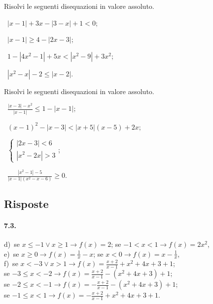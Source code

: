 \begin{esercizio}[\Ast]
 \label{ese:7.36}
Risolvi le seguenti disequazioni in valore assoluto.
\begin{multicols}{2}
 \begin{enumeratea}
 \item~$\left|x-1\right|+3x-\left|3-x\right|+1<0$;
 \item~$\left|x-1\right|\ge 4-\left|2x-3\right|$;
 \item~$1-\left|4x^2-1\right|+5x<\left|x^2-9\right|+3x^2$;
 \item~$\left|x^2-x\right|-2\le \left|x-2\right|$.
 \end{enumeratea}
 \end{multicols}
\end{esercizio}

\begin{esercizio}[\Ast]
 \label{ese:7.37}
Risolvi le seguenti disequazioni in valore assoluto.
\begin{multicols}{2}
 \begin{enumeratea}
 \item~$\frac{\left|x-3\right|-x^2}{\left|x-1\right|}\le 1-\left|x-1\right|$;
 \item~$(x-1)^2-\left|x-3\right|<\left|x+5\right|(x-5)+2x$;
 \item~$\left\{\begin{array}{l}{\left|2x-3\right|<6}\\{\left|x^2-2x\right|>3}\end{array}\right.$;
 \item~$\frac{\left|x^2-1\right|-5}{\left|x-1\right|(x^2-x-6)}\ge 0$.
 \end{enumeratea}
 \end{multicols}
\end{esercizio}

\subsection{Risposte}
\paragraph{7.3.} d)~se $x\le -1\vee x\ge 1\to f(x)=2 $; se $-1<x<1 \to f(x)=2x^2$,\protect\\
\quad e)~se $x\ge 0 \to f(x)=\frac 1 x-x$; se $x<0 \to f(x)=x-\frac 1 x$,\protect\\
\quad f)~se $x<-3\vee x>1 \to f(x)=\frac{x+2}{x-1}+x^2+4x+3+1$;\protect\\ se $-3\le x<-2 \to f(x)=\frac{x+2}{x-1}-(x^2+4x+3)+1$;\protect\\ se $-2\le x<-1\to f(x)=-\frac{x+2}{x-1}-(x^2+4x+3)+1$;\protect\\ se $-1\le x<1\to f(x)=-\frac{x+2}{x-1}+x^2+4x+3+1$.

